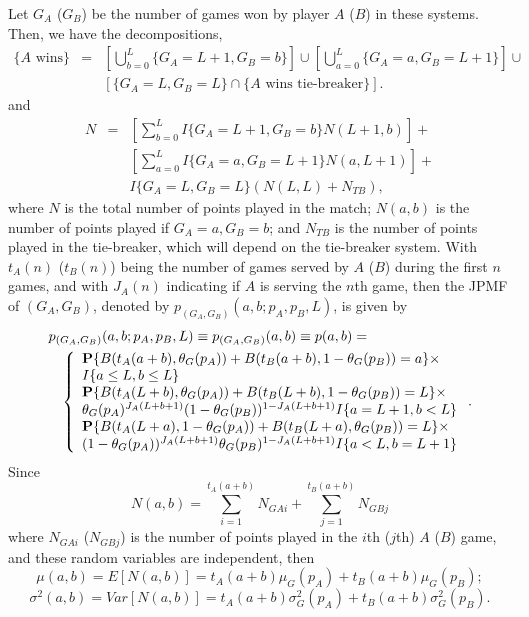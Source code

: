 \documentclass[11pt]{article}
\theoremstyle{plain}
\theoremstyle{definition}
\renewcommand{\Pr}{\mathbf{P}}
\begin{document}
Let $G_A$ ($G_B$) be the number of games won by player $A$ ($B$) in these systems. Then, we have the decompositions,
%
\begin{eqnarray*}
 \{\mbox{$A$\ wins}\} & = & \left[\bigcup_{b=0}^L\{G_A=L+1,G_B=b\}\right] \cup  \left[\bigcup_{a=0}^L \{G_A=a,G_B=L+1\}\right] \cup \\ && \left[\{G_A=L,G_B=L\} \cap \{\mbox{$A$ wins tie-breaker}\}\right].
 \end{eqnarray*}
 and
 \begin{eqnarray*}
 N & = & \left[\sum_{b=0}^L I\{G_A=L+1,G_B=b\} N(L+1,b)\right] + \\ && \left[\sum_{a=0}^L I\{G_A=a,G_B=L+1\} N(a,L+1)\right] + \\ && I\{G_A=L,G_B=L\} (N(L,L) + N_{TB}),
 \end{eqnarray*}
 where $N$ is the total number of points played in the match; $N(a,b)$ is the number of points played if $G_A=a,G_B=b$; and $N_{TB}$ is the number of points played in the tie-breaker, which will depend on the tie-breaker system. With $t_A(n)$ ($t_B(n)$) being the number of games served by $A$ ($B$) during the first $n$ games, and with $J_A(n)$ indicating if $A$ is serving the $n$th game, then the JPMF of $(G_A,G_B)$, denoted by $p_{(G_A,G_B)}(a,b;p_A,p_B,L)$, is given by
 \begin{eqnarray*}
  \lefteqn{ p_{(G_A,G_B)}(a,b;p_A,p_B,L) \equiv p_{(G_A,G_B)}(a,b) \equiv p(a,b) = } \\ &&
  \left\{
  \begin{array}{l}
  \Pr\{B(t_A(a+b),\theta_G(p_A)) + B(t_B(a+b),1-\theta_G(p_B)) = a\} \times \\ I\{a \le L, b \le L\} \\
   \Pr\{B(t_A(L+b),\theta_G(p_A)) + B(t_B(L+b),1-\theta_G(p_B)) = L\} \times \\  \theta_G(p_A)^{J_A(L+b+1)} (1-\theta_G(p_B))^{1-J_A(L+b+1)}I\{a = L+1, b < L\} \\
      \Pr\{B(t_A(L+a),1-\theta_G(p_A)) + B(t_B(L+a),\theta_G(p_B)) = L\} \times \\  (1-\theta_G(p_A))^{J_A(L+b+1)} \theta_G(p_B)^{1-J_A(L+b+1)}I\{a < L, b = L+1\}
  \end{array}
  \right..
 \end{eqnarray*}
Since
%
$$N(a,b) = \sum_{i=1}^{t_A(a+b)} N_{GAi} + \sum_{j=1}^{t_B(a+b)} N_{GBj}$$
%
where $N_{GAi}$ ($N_{GBj}$) is the number of points played in the $i$th ($j$th) $A$ ($B$) game, and these random variables are independent, then
%
$$\mu(a,b) = E[N(a,b)] = t_A(a+b) \mu_G(p_A) + t_B(a+b) \mu_G(p_B);$$
$$\sigma^2(a,b) = Var[N(a,b)] = t_A(a+b) \sigma_G^2(p_A) + t_B(a+b) \sigma_G^2(p_B).$$
\end{document}
